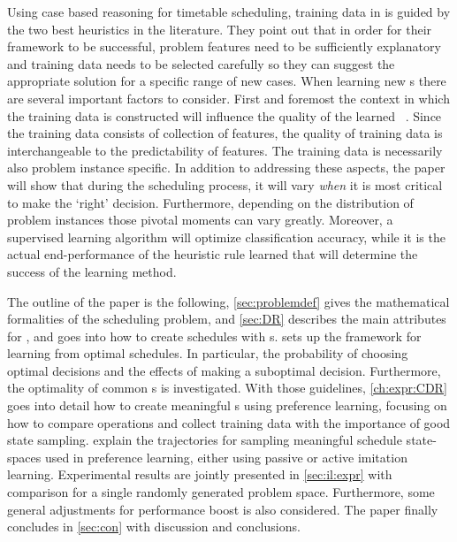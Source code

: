 \documentclass[twocolumn]{svjour3}
\begin{document}
Using case based reasoning for timetable scheduling, training data in 
\cite{Burke06} is guided by the two best heuristics in the literature.
They point out that in order for their framework to be successful, problem 
features need to be sufficiently explanatory and training data needs to be 
selected carefully so they can suggest the appropriate solution for a specific 
range of new cases. 
%
When learning new \dr s there are several important 
factors to consider. First and foremost the context in which the training data is constructed 
will influence the quality of the learned \dr\ \cite{Burke06}. 
Since the training data consists of collection of features, the quality of 
training data is interchangeable to the predictability of features. 
The training data is necessarily also problem instance specific. %
In addition to addressing these aspects, the paper will show that during 
the scheduling process, it will vary \emph{when} it is most critical to make 
the `right' decision. Furthermore, depending on the distribution of problem 
instances those pivotal moments can vary greatly. 
Moreover, a supervised learning algorithm will optimize classification accuracy, while it is the actual end-performance of the heuristic rule learned that will determine the success of the learning method. 

The outline of the paper is the following, \cref{sec:problemdef} gives the 
mathematical formalities of the scheduling problem, and 
\cref{sec:DR} describes the main attributes for \jsp, 
and goes into how to create schedules with \dr s. 
 sets up the framework for learning from optimal schedules. 
In particular, the probability of choosing optimal decisions and the effects of 
making a suboptimal decision. Furthermore, the optimality of common \sdr s is 
investigated.
With those guidelines, \cref{ch:expr:CDR} goes into detail how to create 
meaningful \cdr s using preference learning, focusing on how to 
compare operations and collect training data with the importance of good state 
sampling. 
 explain the trajectories for 
sampling meaningful schedule state-spaces used in preference learning, either 
using passive or active imitation learning. 
Experimental results are jointly presented in \cref{sec:il:expr} with 
comparison for a single randomly generated problem space. Furthermore, some 
general adjustments for performance boost is also considered.
The paper finally concludes in \cref{sec:con} with discussion and conclusions.
\end{document}

